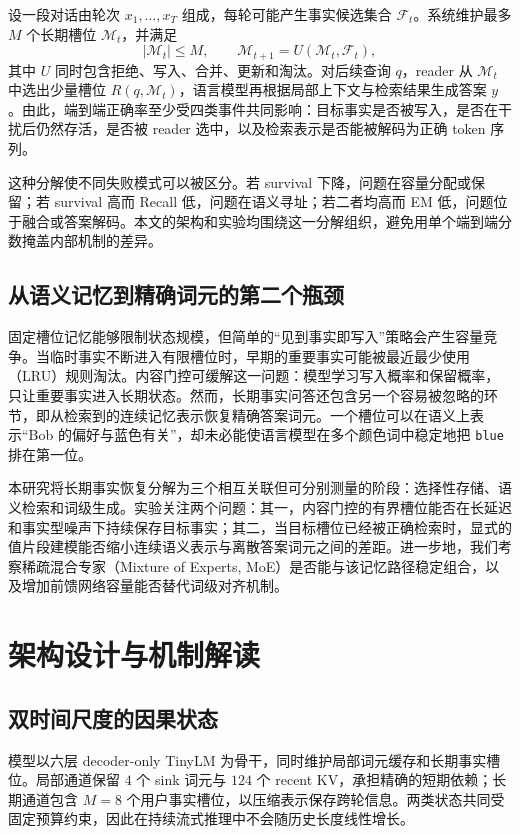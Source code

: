 \documentclass[letterpaper]{article}
\begin{document}
设一段对话由轮次 $x_1,\ldots,x_T$ 组成，每轮可能产生事实候选集合 $\mathcal{F}_t$。系统维护最多 $M$ 个长期槽位 $\mathcal{M}_t$，并满足
\begin{equation}
|\mathcal{M}_t|\leq M,\qquad
\mathcal{M}_{t+1}=U(\mathcal{M}_t,\mathcal{F}_t),
\end{equation}
其中 $U$ 同时包含拒绝、写入、合并、更新和淘汰。对后续查询 $q$，reader 从 $\mathcal{M}_t$ 中选出少量槽位 $R(q,\mathcal{M}_t)$，语言模型再根据局部上下文与检索结果生成答案 $y$。由此，端到端正确率至少受四类事件共同影响：目标事实是否被写入，是否在干扰后仍然存活，是否被 reader 选中，以及检索表示是否能被解码为正确 token 序列。

这种分解使不同失败模式可以被区分。若 survival 下降，问题在容量分配或保留；若 survival 高而 Recall 低，问题在语义寻址；若二者均高而 EM 低，问题位于融合或答案解码。本文的架构和实验均围绕这一分解组织，避免用单个端到端分数掩盖内部机制的差异。

\subsection{从语义记忆到精确词元的第二个瓶颈}

固定槽位记忆能够限制状态规模，但简单的“见到事实即写入”策略会产生容量竞争。当临时事实不断进入有限槽位时，早期的重要事实可能被最近最少使用（LRU）规则淘汰。内容门控可缓解这一问题：模型学习写入概率和保留概率，只让重要事实进入长期状态。然而，长期事实问答还包含另一个容易被忽略的环节，即从检索到的连续记忆表示恢复精确答案词元。一个槽位可以在语义上表示“Bob 的偏好与蓝色有关”，却未必能使语言模型在多个颜色词中稳定地把 \texttt{blue} 排在第一位。

本研究将长期事实恢复分解为三个相互关联但可分别测量的阶段：选择性存储、语义检索和词级生成。实验关注两个问题：其一，内容门控的有界槽位能否在长延迟和事实型噪声下持续保存目标事实；其二，当目标槽位已经被正确检索时，显式的值片段建模能否缩小连续语义表示与离散答案词元之间的差距。进一步地，我们考察稀疏混合专家（Mixture of Experts, MoE）是否能与该记忆路径稳定组合，以及增加前馈网络容量能否替代词级对齐机制。

\section{架构设计与机制解读}

\subsection{双时间尺度的因果状态}

模型以六层 decoder-only TinyLM 为骨干，同时维护局部词元缓存和长期事实槽位。局部通道保留 $4$ 个 sink 词元与 $124$ 个 recent KV，承担精确的短期依赖；长期通道包含 $M=8$ 个用户事实槽位，以压缩表示保存跨轮信息。两类状态共同受固定预算约束，因此在持续流式推理中不会随历史长度线性增长。
\end{document}
